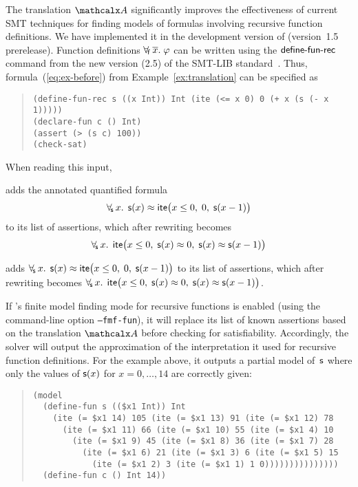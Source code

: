 The translation $\conv$ significantly improves the effectiveness of current SMT
techniques for finding models of formulas involving recursive
function definitions.
We have implemented it in the development version of \cvc %
(version~1.5 prerelease).
Function definitions $\forall_{\!\mathsf{f}\:} \overline{x}.\; \varphi$ can be written using the $\mathsf{define}\text{-}\mathsf{fun}\text{-}\mathsf{rec}$ command
from the new version (2.5) of the SMT-LIB standard~\cite{smtlib25}.
Thus, formula~(\ref{eq:ex-before}) from Example~\ref{ex:translation}
can be specified as %
%
\begin{quote}
\begin{verbatim}
(define-fun-rec s ((x Int)) Int (ite (<= x 0) 0 (+ x (s (- x 1)))))
(declare-fun c () Int)
(assert (> (s c) 100))
(check-sat)
\end{verbatim}
\end{quote}
%
When reading this input,
\begin{longv}%
\cvc adds the annotated quantified formula
$$\forall_{\!\mathsf{s}\:} x.\;\, \mathsf{s}( x ) \approx \mathsf{ite}\bigl( x \leq 0,\; 0,\; \mathsf{s}( x-1 )\bigr)$$
to its list of assertions,
which after rewriting becomes
$$\forall_{\!\mathsf{s}\:} x.\;\, \mathsf{ite}\bigl( x \leq 0,\; \mathsf{s}( x ) \approx 0,\; \mathsf{s}( x ) \approx \mathsf{s}( x-1 ) \bigr)$$
\end{longv}%
\begin{shortv}%
\cvc adds
$\forall_{\!\mathsf{s}\:} x.\;\, \mathsf{s}( x ) \approx \mathsf{ite}\bigl( x \leq 0,\; 0,\; \mathsf{s}( x-1 )\bigr)$
to its list of assertions,
which after rewriting becomes
$\forall_{\!\mathsf{s}\:} x.\;\, \mathsf{ite}\bigl( x \leq 0,\; \mathsf{s}( x ) \approx 0,\; \mathsf{s}( x ) \approx \mathsf{s}( x-1 ) \bigr)$. \end{shortv}%
If \cvc's finite model finding mode for recursive functions is enabled (using
the command-line option \texttt{--fmf-fun}), it will replace its list of known
assertions based on the translation $\conv$ before checking for satisfiability.
Accordingly, the solver will output the approximation of the interpretation it
used for recursive function definitions. 
For the example above, it outputs a partial model of~$\mathsf{s}$ where only
the values of $\mathsf{s}(x)$ for $x = 0,\ldots,14$ are correctly given:
\begin{quote}
\begin{verbatim}
(model
  (define-fun s (($x1 Int)) Int 
    (ite (= $x1 14) 105 (ite (= $x1 13) 91 (ite (= $x1 12) 78 
      (ite (= $x1 11) 66 (ite (= $x1 10) 55 (ite (= $x1 4) 10 
        (ite (= $x1 9) 45 (ite (= $x1 8) 36 (ite (= $x1 7) 28 
          (ite (= $x1 6) 21 (ite (= $x1 3) 6 (ite (= $x1 5) 15 
            (ite (= $x1 2) 3 (ite (= $x1 1) 1 0)))))))))))))))
  (define-fun c () Int 14))
\end{verbatim}
\end{quote}

